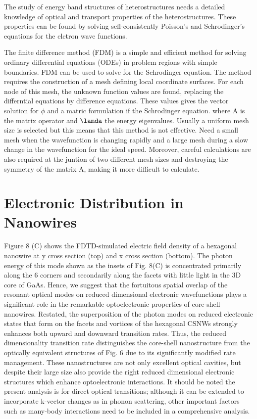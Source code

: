 The study of energy band structures of heterostructures needs a detailed
knowledge of optical and transport properties of the heterostructures. These
properties can be found by solving sefl-consistently Poisson's and
Schrodinger's equations for the elctron wave functions.

The finite difference method (FDM) is a simple and efficient method for solving
ordinary differential equations (ODEs) in problem regions with simple
boundaries. FDM can be used to solve for the Schrodinger equation. The method
requires the construction of a mesh defining local coordinate surfaces. For
each node of this mesh, the unknown function values are found, replacing the
differntial equations by difference equations. These values gives the vector
solution for $\phi$ and a matric formulation if the Schrodinger equation.
where A is the matrix operator and $\lamda$ the energy eigenvalues. Usually a
uniform mesh size is selected but this means that this method is not effective.
Need a small mesh when the wavefunction is changing rapidly and a large mesh
during a slow change in the wavefunction for the ideal speed. Moreover, careful
calculations are also required at the juntion of two different mesh sizes and
destroying the symmetry of the matrix A, making it more difficult to calculate. 


\section{Electronic Distribution in Nanowires} \label{sec:spectra}

Figure 8 (C) shows the FDTD-simulated electric field density of a hexagonal
nanowire at y cross section (top) and x cross section (bottom). The photon
energy of this mode shown as the insets of Fig. 8(C) is concentrated primarily
along the 6 corners and secondarily along the facets with little light in the
3D core of GaAs. Hence, we suggest that the fortuitous spatial overlap of the
resonant optical modes on reduced dimensional electronic wavefunctions plays a
significant role in the remarkable optoelectronic properties of core-shell
nanowires. Restated, the superposition of the photon modes  on reduced
electronic states that form on the facets and vortices of the hexagonal CSNWs
strongly enhances both upward and downward transition rates.  Thus, the reduced
dimensionality transition rate distinguishes the core-shell nanostructure from
the optically equivalent structures of Fig. 6 due to its significantly modified
rate management. These nanostructures are not only excellent optical cavities,
but despite their large size also provide the right reduced dimensional
electronic structures which enhance optoelectronic interactions.  It should be
noted the present analysis is for direct optical transitions; although it can
be extended to incorporate k-vector changes as in phonon scattering, other
important factors such as many-body interactions need to be included in a
comprehensive analysis.


